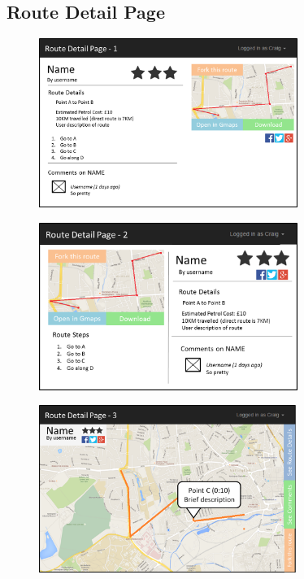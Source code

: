 \newpage 
\subsection{Route Detail Page}
\begin{figure}[!ht]
	\begin{center}
		\includegraphics[width=0.75\textwidth]{images/appendix/rdp1.png}
	\end{center}
	\vspace{-6mm}
\end{figure}

\begin{figure}[!ht]
	\begin{center}
		\includegraphics[width=0.75\textwidth]{images/appendix/rdp2.png}
	\end{center}
	\vspace{-6mm}
\end{figure}

\begin{figure}[!ht]
	\begin{center}
		\includegraphics[width=0.75\textwidth]{images/appendix/rdp3.png}
	\end{center}
	\vspace{-6mm}
\end{figure}

